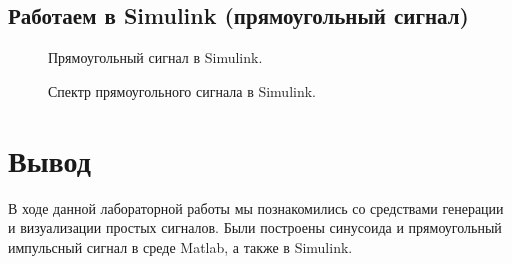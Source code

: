 \documentclass[12pt,a4paper]{scrartcl}
\begin{document}
\clearpage
\newpage
\subsection{Работаем в Simulink (прямоугольный сигнал)}
\label{sec:workSim2}


\begin{figure}[h!]
\caption{Прямоугольный сигнал в Simulink.}
\end{figure}

\begin{figure}[h!]
\caption{Спектр прямоугольного сигнала в Simulink.}
\end{figure}

\clearpage
\newpage

\section{Вывод}
\label{sec:afterWork}
В ходе данной лабораторной работы мы познакомились со средствами генерации и визуализации простых сигналов. Были построены синусоида и прямоугольный импульсный сигнал в среде Matlab, а также в Simulink.
\end{document}
